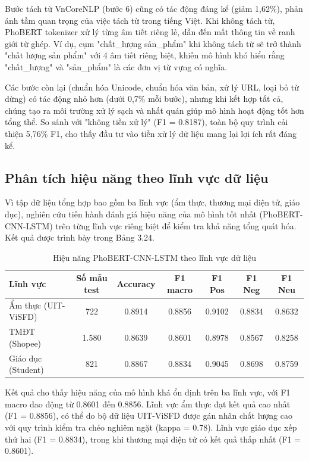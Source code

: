 \documentclass[14pt, a4paper]{report}
\begin{document}
Bước tách từ VnCoreNLP (bước 6) cũng có tác động đáng kể (giảm 1,62\%), phản ánh tầm quan trọng của việc tách từ trong tiếng Việt. Khi không tách từ, PhoBERT tokenizer xử lý từng âm tiết riêng lẻ, dẫn đến mất thông tin về ranh giới từ ghép. Ví dụ, cụm "chất\_lượng sản\_phẩm" khi không tách từ sẽ trở thành "chất lượng sản phẩm" với 4 âm tiết riêng biệt, khiến mô hình khó hiểu rằng "chất\_lượng" và "sản\_phẩm" là các đơn vị từ vựng có nghĩa.


Các bước còn lại (chuẩn hóa Unicode, chuẩn hóa văn bản, xử lý URL, loại bỏ từ dừng) có tác động nhỏ hơn (dưới 0,7\% mỗi bước), nhưng khi kết hợp tất cả, chúng tạo ra môi trường xử lý sạch và nhất quán giúp mô hình hoạt động tốt hơn tổng thể. So sánh với "không tiền xử lý" (F1 = 0.8187), toàn bộ quy trình cải thiện 5,76\% F1, cho thấy đầu tư vào tiền xử lý dữ liệu mang lại lợi ích rất đáng kể.


\subsection{Phân tích hiệu năng theo lĩnh vực dữ liệu}


Vì tập dữ liệu tổng hợp bao gồm ba lĩnh vực (ẩm thực, thương mại điện tử, giáo dục), nghiên cứu tiến hành đánh giá hiệu năng của mô hình tốt nhất (PhoBERT-CNN-LSTM) trên từng lĩnh vực riêng biệt để kiểm tra khả năng tổng quát hóa. Kết quả được trình bày trong Bảng 3.24.


\begin{table}[h]
\centering
\caption{Hiệu năng PhoBERT-CNN-LSTM theo lĩnh vực dữ liệu}
\begin{tabular}{|l|c|c|c|c|c|c|}
\hline
\textbf{Lĩnh vực} & \textbf{Số mẫu test} & \textbf{Accuracy} & \textbf{F1 macro} & \textbf{F1 Pos} & \textbf{F1 Neg} & \textbf{F1 Neu} \\
\hline
Ẩm thực (UIT-ViSFD) & 722 & 0.8914 & 0.8856 & 0.9102 & 0.8834 & 0.8632 \\
\hline
TMĐT (Shopee) & 1.580 & 0.8639 & 0.8601 & 0.8978 & 0.8567 & 0.8258 \\
\hline
Giáo dục (Student) & 821 & 0.8867 & 0.8834 & 0.9045 & 0.8698 & 0.8759 \\
\hline
\end{tabular}
\end{table}




Kết quả cho thấy hiệu năng của mô hình khá ổn định trên ba lĩnh vực, với F1 macro dao động từ 0.8601 đến 0.8856. Lĩnh vực ẩm thực đạt kết quả cao nhất (F1 = 0.8856), có thể do bộ dữ liệu UIT-ViSFD được gán nhãn chất lượng cao với quy trình kiểm tra chéo nghiêm ngặt (kappa = 0.78). Lĩnh vực giáo dục xếp thứ hai (F1 = 0.8834), trong khi thương mại điện tử có kết quả thấp nhất (F1 = 0.8601).
\end{document}
